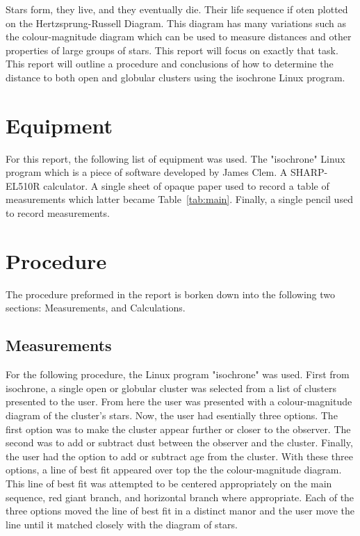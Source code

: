 \documentclass{article}
\begin{document}
Stars form, they live, and they eventually die. Their life sequence if oten plotted on the
Hertzsprung-Russell Diagram. This diagram has many variations such as the colour-magnitude
diagram which can be used to measure distances and other properties of large groups of stars.
This report will focus on exactly that task. This report will outline a procedure and
conclusions of how to determine the distance to both open and globular clusters using the
isochrone Linux program.\


\section{Equipment}

For this report, the following list of equipment was used. The "isochrone" Linux program
which is a piece of software developed by James Clem. A SHARP-EL510R calculator.
A single sheet of opaque paper used to record a table of measurements which latter
became Table~\ref{tab:main}. Finally, a single pencil used to record measurements.


\section{Procedure}

The procedure preformed in the report is borken down into the following two sections:
Measurements, and Calculations.

\subsection{Measurements}

For the following procedure, the Linux program "isochrone" was used. First from
isochrone, a single open or globular cluster was selected from a list of clusters
presented to the user. From here the user was presented with a colour-magnitude
diagram of the cluster's stars. Now, the user had esentially three options. The
first option was to make the cluster appear further or closer to the observer. The
second was to add or subtract dust between the observer and the cluster. Finally,
the user had the option to add or subtract age from the cluster. With these three 
options, a line of best fit appeared over top the the colour-magnitude diagram. 
This line of best fit was attempted to be centered appropriately on the main 
sequence, red giant branch, and horizontal branch where appropriate. Each of the
three options moved the line of best fit in a distinct manor and the user
move the line until it matched closely with the diagram of stars.\\
\end{document}
